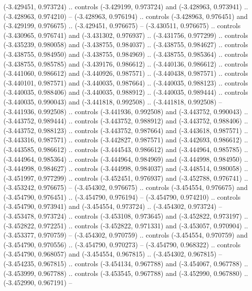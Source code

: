     (-3.429451, 0.973724) .. controls (-3.429199, 0.973724) and (-3.428963, 0.973941) ..
    (-3.428963, 0.974210) --
    (-3.428963, 0.976194) .. controls (-3.428963, 0.976451) and (-3.429199, 0.976675) ..
    (-3.429451, 0.976675) --
    (-3.430511, 0.976675) .. controls (-3.430965, 0.976741) and (-3.431302, 0.976937) ..
    (-3.431756, 0.977299) .. controls (-3.435239, 0.980058) and (-3.438755, 0.984037) ..
    (-3.438755, 0.984627) .. controls (-3.438755, 0.984950) and (-3.438755, 0.984969) ..
    (-3.438755, 0.985364) .. controls (-3.438755, 0.985785) and (-3.439176, 0.986612) ..
    (-3.440136, 0.986612) .. controls (-3.441060, 0.986612) and (-3.440926, 0.987571) ..
    (-3.440438, 0.987571) .. controls (-3.440101, 0.987571) and (-3.440035, 0.987664) ..
    (-3.440035, 0.988123) .. controls (-3.440035, 0.988406) and (-3.440035, 0.988912) ..
    (-3.440035, 0.989444) .. controls (-3.440035, 0.990043) and (-3.441818, 0.992508) ..
    (-3.441818, 0.992508) --
    (-3.441936, 0.992508) .. controls (-3.441936, 0.992508) and (-3.443752, 0.990043) ..
    (-3.443752, 0.989444) .. controls (-3.443752, 0.988912) and (-3.443752, 0.988406) ..
    (-3.443752, 0.988123) .. controls (-3.443752, 0.987664) and (-3.443618, 0.987571) ..
    (-3.443316, 0.987571) .. controls (-3.442827, 0.987571) and (-3.442693, 0.986612) ..
    (-3.443585, 0.986612) .. controls (-3.444543, 0.986612) and (-3.444964, 0.985785) ..
    (-3.444964, 0.985364) .. controls (-3.444964, 0.984969) and (-3.444998, 0.984950) ..
    (-3.444998, 0.984627) .. controls (-3.444998, 0.984037) and (-3.448514, 0.980058) ..
    (-3.451997, 0.977299) .. controls (-3.452451, 0.976937) and (-3.452788, 0.976741) ..
    (-3.453242, 0.976675) --
    (-3.454302, 0.976675) .. controls (-3.454554, 0.976675) and (-3.454790, 0.976451) ..
    (-3.454790, 0.976194) --
    (-3.454790, 0.974210) .. controls (-3.454790, 0.973941) and (-3.454554, 0.973724) ..
    (-3.454302, 0.973724) --
    (-3.453478, 0.973724) .. controls (-3.453108, 0.973645) and (-3.452822, 0.973197) ..
    (-3.452822, 0.972251) .. controls (-3.452822, 0.971331) and (-3.453057, 0.970904) ..
    (-3.453377, 0.970759) --
    (-3.454302, 0.970759) .. controls (-3.454554, 0.970759) and (-3.454790, 0.970556) ..
    (-3.454790, 0.970273) --
    (-3.454790, 0.968322) .. controls (-3.454790, 0.968057) and (-3.454554, 0.967815) ..
    (-3.454302, 0.967815) --
    (-3.454235, 0.967815) .. controls (-3.454134, 0.967788) and (-3.454067, 0.967788) ..
    (-3.453999, 0.967788) .. controls (-3.453545, 0.967788) and (-3.452990, 0.967880) ..
    (-3.452990, 0.967191) --
